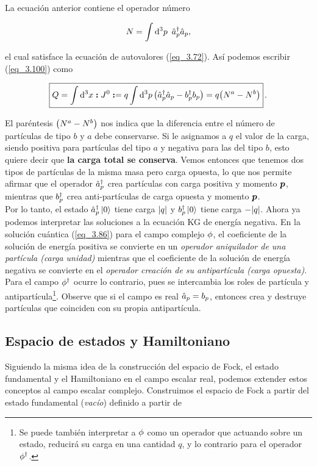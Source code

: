 La ecuación anterior contiene el operador número 

\begin{equation}
    N = \int \dd[3]{p}~\hat{a}^\dag_p \hat{a}_p,
\end{equation}

el cual satisface la ecuación de autovalores (\ref{eq_3.72}). Así podemos escribir (\ref{eq_3.100}) como

\begin{equation}
	\boxed{
    	Q = \int \dd[3]{x} \vb*{:} J^0 \vb*{:} = q\int \dd[3]{p} \qty( \hat{a}_{p}^{\dag} \hat{a}_p - b_p^{\dag}b_p ) = q \qty\big(N^a - N^b) } \, .
    \label{eq_3.102}
\end{equation}

El paréntesis $\qty\big(N^a - N^b)$ nos indica que la diferencia entre el número de partículas de tipo $b$ y $a$ debe conservarse. Si le asignamos a $q$ el valor de la carga, siendo positiva para partículas del tipo $a$ y negativa para las del tipo $b$, esto quiere decir que \textbf{la carga total se conserva}. Vemos entonces que tenemos dos tipos de partículas de la misma masa pero carga opuesta, lo que nos permite afirmar que el operador $\hat{a}^{\dag}_p$ crea partículas con carga positiva y momento $\vb*{p}$, mientras que $b^\dag_p$ crea anti-partículas de carga opuesta y momento $\vb*{p}$.\\

Por lo tanto, el estado $\hat{a}_p^\dag \ket{0}$ tiene carga $\abs{q}$ y $b_p^\dag \ket{0}$ tiene carga $-\abs{q}$. Ahora ya podemos interpretar las soluciones a la ecuación KG de energía negativa. En la solución cuántica (\ref{eq_3.86}) para el campo complejo $\phi$, el coeficiente de la solución de energía positiva se convierte en un \emph{operador aniquilador de una partícula (carga unidad)} mientras que el coeficiente de la solución de energía negativa se convierte en el \emph{operador creación de su antipartícula (carga opuesta)}. Para el campo $\phi^\dag$ ocurre lo contrario, pues se intercambia los roles de partícula y antipartícula\footnote{Se puede también interpretar a $\phi$ como un operador que actuando sobre un estado, reducirá su carga en una cantidad $q$, y lo contrario para el operador $\phi^\dag$.}. Observe que si el campo es real $\hat{a}_p=b_p$, entonces crea y destruye partículas que coinciden con su propia antipartícula. 

\subsection{Espacio de estados y Hamiltoniano}
Siguiendo la misma idea de la construcción del espacio de Fock, el estado fundamental y el Hamiltoniano en el campo escalar real, podemos extender estos conceptos al campo escalar complejo. Construimos el espacio de Fock a partir del estado fundamental (\emph{vacío}) definido a partir de

